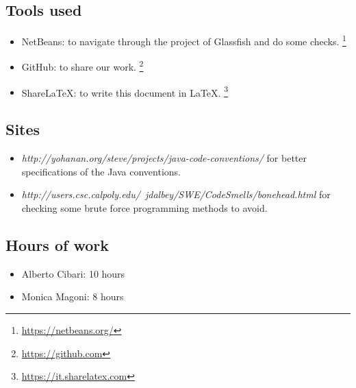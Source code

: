 \subsection*{Tools used}
    \begin{itemize}
        \item NetBeans: to navigate through the project of Glassfish and do some checks. 
            \footnote{\url{https://netbeans.org/}} 
        \item GitHub: to share our work. 
            \footnote{\url{https://github.com}} 
        \item ShareLaTeX: to write this document in LaTeX. 
            \footnote{\url{https://it.sharelatex.com}}
    \end{itemize}

\subsection*{Sites}
    \begin{itemize}
        \item \textit{http://yohanan.org/steve/projects/java-code-conventions/} for better specifications of the Java conventions.
        \item \textit{http://users.csc.calpoly.edu/~jdalbey/SWE/CodeSmells/bonehead.html} for checking some brute force programming methods to avoid.
    \end{itemize}

\subsection*{Hours of work}
    \begin{itemize}
    \item Alberto Cibari: 10 hours
    \item Monica Magoni:  8 hours
    \end{itemize}
